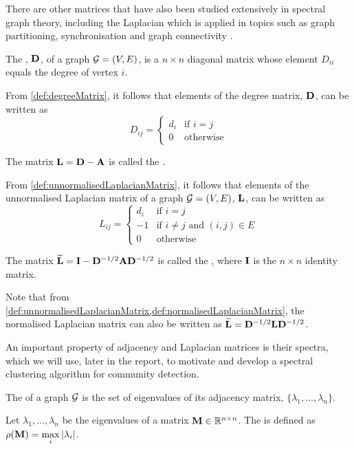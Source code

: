 There are other matrices that have also been studied extensively in spectral graph theory, including the Laplacian which is applied in topics such as graph partitioning, synchronisation and graph connectivity \cite{For10}.
\begin{definition}
	\label{def:degreeMatrix}
	The , $\mathbf D$, of a graph $\mathcal G = (V,E)$, is a $n \times n$ diagonal matrix whose element $D_{ii}$ equals the degree of vertex $i$.
\end{definition}
From \cref{def:degreeMatrix}, it follows that elements of the degree matrix, $\mathbf D$, can be written as
\begin{equation*}
	 D_{ij} =
	\begin{cases}
		d_{i} & \text{if } i = j\\
		0 & \text{otherwise}
	\end{cases}
\end{equation*}
\begin{definition}
	\label{def:unnormalisedLaplacianMatrix}
	The matrix $\mathbf L = \mathbf D  - \mathbf A $ is called the .
\end{definition}
From \cref{def:unnormalisedLaplacianMatrix}, it follows that elements of the unnormalised Laplacian matrix of a graph $\mathcal G = (V,E)$, $\mathbf L$, can be written as
\begin{equation*}
	L_{ij} =
	\begin{cases}
		d_{i} & \text{if } i = j\\
		-1 & \text{if } i \neq j \text{ and }  (i,j) \in E\\
		0 & \text{otherwise}
	\end{cases}
\end{equation*}
\begin{definition}
	\label{def:normalisedLaplacianMatrix}
	The matrix $\widetilde{\mathbf L} = \mathbf I  - \mathbf D^{-1/2}\mathbf A\mathbf D^{-1/2}$ is called the , where $\mathbf I$ is the $n \times n$ identity matrix.
\end{definition}
Note that from \cref{def:unnormalisedLaplacianMatrix,def:normalisedLaplacianMatrix}, the normalised Laplacian matrix can also be written as $\widetilde{\mathbf L} = \mathbf D^{-1/2}\mathbf L\mathbf D^{-1/2}$.

An important property of adjacency and Laplacian matrices is their spectra, which we will use, later in the report, to motivate and develop a spectral clustering algorithm for community detection.
\begin{definition}
	\label{def:spectrum}
	The  of a graph $\mathcal G$ is the set of eigenvalues of its adjacency matrix, $\{\lambda_{1},\dots,\lambda_{n}\}$.
\end{definition}
\begin{definition}
	\label{def:spectralRadius}
	Let $\lambda_{1},\dots,\lambda_{n}$ be the eigenvalues of a matrix $\mathbf M \in \mathbb{R}^{n \times n}$. The  is defined as $\rho(\mathbf M) = \max\limits_{i} \left\vert\lambda_{i}\right\vert$.
\end{definition}


